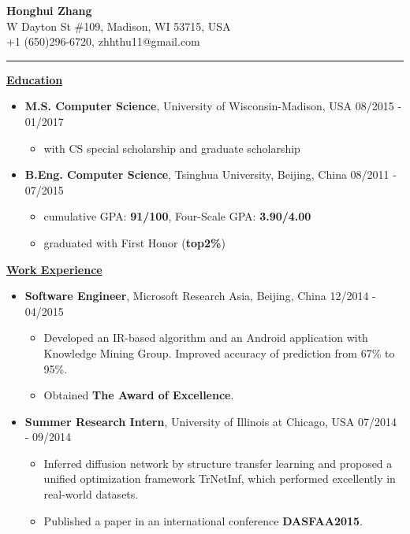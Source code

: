 \documentclass[11pt]{article}
\begin{document}
\begin{CJK}{GBK}{kai}
\begin{center}
  {\textbf{\huge Honghui Zhang}}\\ W Dayton St \#109, Madison, WI 53715, USA\\
  +1 (650)296-6720, zhhthu11@gmail.com\\
\end{center}
\rule[4pt]{16.5cm}{0.5pt}
{ \textbf{\underline{Education}}}\\\medskip
\begin{itemize}
  \item \textbf{M.S. Computer Science}, University of Wisconsin-Madison, USA \hfill 08/2015 - 01/2017\\
    \begin{itemize}
    \item with CS special scholarship and graduate scholarship\\\medskip
    \end{itemize}
 \item \textbf{B.Eng. Computer Science}, Tsinghua University, Beijing, China \hfill 08/2011 - 07/2015\\
    \begin{itemize}
    \item cumulative GPA: \textbf{91/100}, Four-Scale GPA: \textbf{3.90/4.00}
    \item graduated with First Honor (\textbf{top2\%})
    \end{itemize}
\end{itemize}

\bigskip

{ \textbf{\underline{Work Experience}}}\\\medskip

\begin{itemize}
   \item \textbf{Software Engineer}, Microsoft Research Asia, Beijing, China \hfill 12/2014 - 04/2015\\
     \begin{itemize}
     \item Developed an IR-based algorithm and an Android application with Knowledge Mining Group. Improved accuracy of prediction from 67\% to 95\%.
     \item Obtained \textbf{The Award of Excellence}.\\\medskip
     \end{itemize}

   \item \textbf{Summer Research Intern}, University of Illinois at Chicago, USA \hfill 07/2014 - 09/2014\\
     \begin{itemize}
     \item Inferred diffusion network  by structure transfer learning and proposed a unified optimization framework TrNetInf, which performed excellently in real-world datasets.
     \item Published a paper in an international conference \textbf{DASFAA2015}. \\\medskip
     \end{itemize}
  

\end{itemize}
\end{CJK}
\end{document}
